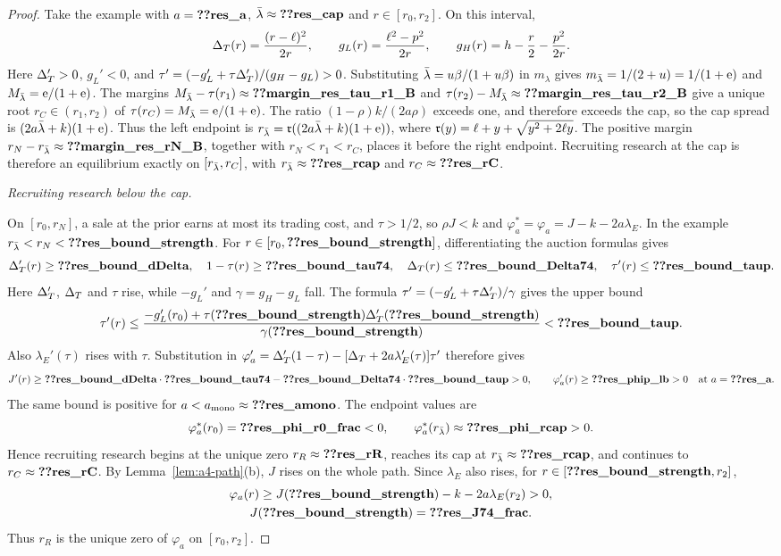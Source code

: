 \begin{proof}
Take the example with \(a=\reg{res_a}\), \(\lb\approx\reg{res_cap}\) and \(r\in[r_0,r_2]\). On this interval,
\[
 \Delta_T(r)=\frac{(r-\ell)^2}{2r},\qquad
 g_L(r)=\frac{\ell^2-p^2}{2r},\qquad
 g_H(r)=h-\frac r2-\frac{p^2}{2r}.
\]
Here \(\Delta_T'>0\), \(g_L'<0\), and
\(\tau'=(-g_L'+\tau\Delta_T')/(g_H-g_L)>0\).
Substituting \(\bar\lambda=u\beta/(1+u\beta)\) in \(m_\lambda\) gives
\(m_{\bar\lambda}=1/(2+u)=1/(1+\mathrm{e})\) and \(M_{\bar\lambda}=\mathrm{e}/(1+\mathrm{e})\).
The margins
\(M_{\lb}-\tau(r_1)\approx\reg{margin_res_tau_r1_B}\) and
\(\tau(r_2)-M_{\lb}\approx\reg{margin_res_tau_r2_B}\) give a unique root
\(r_C\in(r_1,r_2)\) of \(\tau(r_C)=M_{\bar\lambda}=\mathrm{e}/(1+\mathrm{e})\).
The ratio \((1-\rho)k/(2a\rho)\) exceeds one, and therefore exceeds the cap, so
the cap spread is \((2a\bar\lambda+k)(1+\mathrm{e})\). Thus the left endpoint is
\(r_{\bar\lambda}=\mathfrak{r}((2a\bar\lambda+k)(1+\mathrm{e}))\), where
\(\mathfrak{r}(y)=\ell+y+\sqrt{y^2+2\ell y}\).
The positive margin \(r_N-r_{\lb}\approx\reg{margin_res_rN_B}\), together with \(r_N<r_1<r_C\), places it before the
right endpoint. Recruiting research at the cap is therefore an equilibrium exactly on
\([r_{\bar\lambda},r_C]\), with \(r_{\lb}\approx\reg{res_rcap}\) and \(r_C\approx\reg{res_rC}\).

\emph{Recruiting research below the cap.}

On \([r_0,r_N]\), a sale at the prior earns at most its trading cost, and \(\tau>1/2\), so \(\rho J<k\) and
\(\varphi_a^*=\varphi_a=J-k-2a\lambda_E\). In the example \(r_{\lb}<r_N<\reg{res_bound_strength}\).
For \(r\in[r_0,\reg{res_bound_strength}]\), differentiating the auction formulas gives
\[
 \DT'(r)\ge\reg{res_bound_dDelta},\quad
 1-\tau(r)\ge\reg{res_bound_tau74},\quad
 \DT(r)\le\reg{res_bound_Delta74},\quad
 \tau'(r)\le\reg{res_bound_taup}.
\]
Here \(\Delta_T'\), \(\Delta_T\) and \(\tau\) rise, while \(-g_L'\) and \(\gamma=g_H-g_L\) fall. The formula
\(\tau'=(-g_L'+\tau\Delta_T')/\gamma\) gives the upper bound
\[
 \tau'(r)\le
 \frac{-g_L'(r_0)+\tau(\reg{res_bound_strength})\DT'(\reg{res_bound_strength})}
 {\gamma(\reg{res_bound_strength})}
 <\reg{res_bound_taup}.
\]
Also \(\lambda_E'(\tau)\) rises with \(\tau\). Substitution in
\(\varphi_a'=\Delta_T'(1-\tau)-[\Delta_T+2a\lambda_E'(\tau)]\tau'\) therefore gives
\[
 J'(r)\ge \reg{res_bound_dDelta}\cdot\reg{res_bound_tau74}
 -\reg{res_bound_Delta74}\cdot\reg{res_bound_taup}>0,\qquad
 \varphi_a'(r)\ge\reg{res_phip_lb}>0
 \quad\text{at }a=\reg{res_a}.
\]
The same bound is positive for \(a<a_{\rm mono}\approx\reg{res_amono}\).
The endpoint values are
\[
 \varphi_a^*(r_0)=\reg{res_phi_r0_frac}<0,
 \qquad \varphi_a^*(r_{\lb})\approx\reg{res_phi_rcap}>0.
\]
Hence recruiting research begins at the unique zero \(r_R\approx\reg{res_rR}\), reaches its cap at
\(r_{\lb}\approx\reg{res_rcap}\), and continues to \(r_C\approx\reg{res_rC}\).
By Lemma~\ref{lem:a4-path}(b), \(J\) rises on the whole path. Since \(\lambda_E\) also rises, for
\(r\in[\reg{res_bound_strength},r_2]\),
\begin{gather*}
 \varphi_a(r)\ge J(\reg{res_bound_strength})-k-2a\lambda_E(r_2)>0,\\
 J(\reg{res_bound_strength})=\reg{res_J74_frac}.
\end{gather*}
Thus \(r_R\) is the unique zero of \(\varphi_a\) on \([r_0,r_2]\).


\end{proof}
